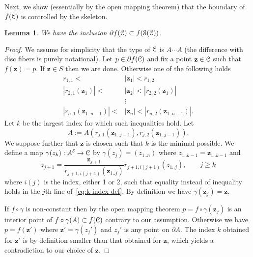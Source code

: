 \documentclass[reqno]{amsart}
\newtheorem{Lem}[Cor]{Lemma}{\bfseries}{\itshape}
\renewcommand\ge{\geqslant} \renewcommand\le{\leqslant}
\renewcommand\~[1]{\widetilde{#1}}
\def\cS{{\mathcal S}} \def\cSc{{\mathcal S \mathcal C}}
\def\vz{{\mathbf z}}
\begin{document}
Next, we show (essentially by the open mapping theorem) that the
boundary of $f({\mathcal C})$ is controlled by the skeleton.

\begin{Lem}\label{lem:boundary-vs-skeleton}
  We have the inclusion $\partial f(\cC) \subset f(\cS(\cC))$.
\end{Lem}
\begin{proof}
  We assume for simplicity that the type of ${\mathcal C}$ is $A\cdots A$ (the
  difference with disc fibers is purely notational). Let
  $p\in\partial f({\mathcal C})$ and fix a point $\vz\in\cC$ such that
  $f(\vz)=p$. If $\vz\in S$ then we are done. Otherwise one of the
  following holds
  \begin{equation}\label{eq:k-index-def}
    \begin{aligned}
      r_{1,1} < &|\vz_1|< r_{1,2}  \\
      |r_{2,1}(\vz_1)| < &|\vz_2| <|r_{2,2}(\vz_1)| \\
      &\vdots \\
      |r_{n,1}(\vz_{1..n-1})| < &|\vz_n| < |r_{n,2}(\vz_{1..n-1})|.
    \end{aligned}
  \end{equation}
  Let $k$ be the largest index for which such inequalities hold. Let
  \begin{equation}
    A := A(r_{j,1}(\vz_{1..j-1}),r_{j,2}(\vz_{1..j-1})).
  \end{equation}
  We suppose further that $\vz$ is chosen such that $k$ is the minimal
  possible. We define a map $\gamma(z_k):A^\delta\to{\mathcal C}$ by
  $\gamma(z_j) =(z_{1..n})$ where $z_{1..k-1}=\vz_{1..k-1}$ and
  \begin{equation}
    z_{j+1} = \frac{\vz_{j+1}}{r_{j+1,i(j+1)}(\vz_{1..j})} r_{j+1,i(j+1)}(z_{1..j}),  \qquad
    j\ge k
  \end{equation}
  where $i(j)$ is the index, either 1 or 2, such that equality instead
  of inequality holds in the $j$th line
  of~\eqref{eq:k-index-def}. By definition we have $\gamma(\vz_j)=\vz$.

  If $f\circ\gamma$ is non-constant then by the open mapping theorem
  $p=f\circ\gamma(\vz_j)$ is an interior point of
  $f\circ\gamma(A)\subset f({\mathcal C})$ contrary to our
  assumption. Otherwise we have $p=f(\vz')$ where $\vz'=\gamma(z_j')$
  and $z_j'$ is any point on $\partial A$. The index $k$ obtained for
  $\vz'$ is by definition smaller than that obtained for $\vz$, which
  yields a contradiction to our choice of $\vz$.
\end{proof}
\end{document}
